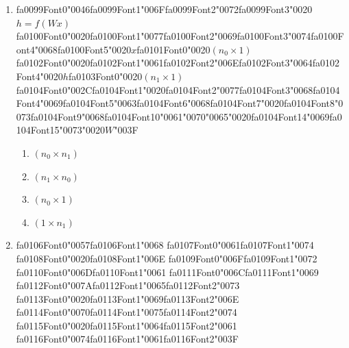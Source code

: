 \documentclass[12pt]{article}
\begin{document}
\begin{enumerate}[label=Q\arabic*.]
\item {\csname fa0099Font0\endcsname\char"0046}{\csname fa0099Font1\endcsname\char"006F}{\csname fa0099Font2\endcsname\char"0072}{\csname fa0099Font3\endcsname\char"0020}$h = f(Wx)${\csname fa0100Font0\endcsname\char"0020}{\csname fa0100Font1\endcsname\char"0077}{\csname fa0100Font2\endcsname\char"0069}{\csname fa0100Font3\endcsname\char"0074}{\csname fa0100Font4\endcsname\char"0068}{\csname fa0100Font5\endcsname\char"0020}$x${\csname fa0101Font0\endcsname\char"0020}$(n_0 \times 1)${\csname fa0102Font0\endcsname\char"0020}{\csname fa0102Font1\endcsname\char"0061}{\csname fa0102Font2\endcsname\char"006E}{\csname fa0102Font3\endcsname\char"0064}{\csname fa0102Font4\endcsname\char"0020}$h${\csname fa0103Font0\endcsname\char"0020}$(n_1 \times 1)${\csname fa0104Font0\endcsname\char"002C}{\csname fa0104Font1\endcsname\char"0020}{\csname fa0104Font2\endcsname\char"0077}{\csname fa0104Font3\endcsname\char"0068}{\csname fa0104Font4\endcsname\char"0069}{\csname fa0104Font5\endcsname\char"0063}{\csname fa0104Font6\endcsname\char"0068}{\csname fa0104Font7\endcsname\char"0020}{\csname fa0104Font8\endcsname\char"0073}{\csname fa0104Font9\endcsname\char"0068}{\csname fa0104Font10\endcsname\char"0061}{\char"0070}{\char"0065}{\char"0020}{\csname fa0104Font14\endcsname\char"0069}{\csname fa0104Font15\endcsname\char"0073}{\char"0020}$W${\char"003F}
\begin{enumerate}[label=(\Alph*)]
    \item $(n_0 \times n_1)$
    \item $(n_1 \times n_0)$
    \item $(n_0 \times 1)$
    \item $(1 \times n_1)$
\end{enumerate}
\item {\csname fa0106Font0\endcsname\char"0057}{\csname fa0106Font1\endcsname\char"0068} {\csname fa0107Font0\endcsname\char"0061}{\csname fa0107Font1\endcsname\char"0074} {\csname fa0108Font0\endcsname\char"0020}{\csname fa0108Font1\endcsname\char"006E} {\csname fa0109Font0\endcsname\char"006F}{\csname fa0109Font1\endcsname\char"0072} {\csname fa0110Font0\endcsname\char"006D}{\csname fa0110Font1\endcsname\char"0061} {\csname fa0111Font0\endcsname\char"006C}{\csname fa0111Font1\endcsname\char"0069} {\csname fa0112Font0\endcsname\char"007A}{\csname fa0112Font1\endcsname\char"0065}{\csname fa0112Font2\endcsname\char"0073} {\csname fa0113Font0\endcsname\char"0020}{\csname fa0113Font1\endcsname\char"0069}{\csname fa0113Font2\endcsname\char"006E} {\csname fa0114Font0\endcsname\char"0070}{\csname fa0114Font1\endcsname\char"0075}{\csname fa0114Font2\endcsname\char"0074} {\csname fa0115Font0\endcsname\char"0020}{\csname fa0115Font1\endcsname\char"0064}{\csname fa0115Font2\endcsname\char"0061} {\csname fa0116Font0\endcsname\char"0074}{\csname fa0116Font1\endcsname\char"0061}{\csname fa0116Font2\endcsname\char"003F}

\end{enumerate}
\end{document}
